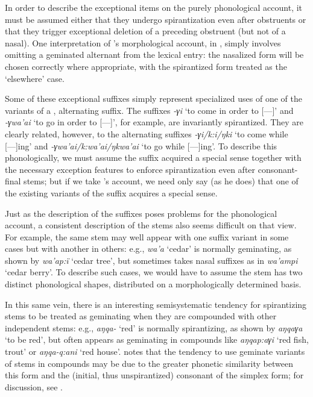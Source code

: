 In order to describe the exceptional items on the purely phonological
account, it must be assumed either that they undergo spirantization
even after obstruents or that they trigger exceptional deletion of a
preceding obstruent (but not of a nasal). One interpretation of
{\Sapir}'s morphological account, in , simply involves omitting a
geminated alternant from the lexical entry: the nasalized form will be
chosen correctly where appropriate, with the spirantized form treated
as the `elsewhere' case.

Some of these exceptional suffixes simply represent specialized uses
of one of the variants of a , alternating suffix. The suffixes
\emph{-γi} `to come in order to {[---]}' and \emph{-γwa'ai} `to go in
order to {[---]}', for example, are invariantly spirantized. They are
clearly related, however, to the alternating suffixes
\emph{-γi/k:i/ŋki} `to come while {[---]}ing' and
\emph{-γwa'ai/k:wa'ai/ŋkwa'ai} `to go while {[---]}ing'. To describe
this phonologically, we must assume the suffix acquired a special
sense together with the necessary exception features to enforce
spirantization even after consonant-final stems; but if we take
{\Sapir}'s account, we need only say (as he does) that one of the
existing variants of the  suffix acquires a special sense.

Just as the description of the suffixes poses problems for the
phonological account, a consistent description of the stems also seems
difficult on that view. For example, the same stem may well appear
with one suffix variant in some cases but with another in others:
e.g., \emph{wa'a} `cedar' is normally geminating, as shown by
\emph{wa'ap:ï} `cedar tree', but sometimes takes nasal suffixes as in
\emph{wa'ampi} `cedar berry'. To describe such cases, we would have to
assume the stem has two distinct phonological shapes, distributed on a
morphologically determined basis.

In this same vein, there is an interesting semisystematic tendency for
spirantizing stems to be treated as geminating when they are
compounded with other independent stems: e.g., \emph{aŋqa-} `red' is
normally spirantizing, as shown by \emph{aŋqaγa} `to be red', but
often appears as geminating in compounds like \emph{aŋqap:aγi} `red
fish, trout' or \emph{aŋqa-q:ani} `red house'. {\Sapir} notes that the
tendency to use geminate variants of stems in compounds may be due to
the greater phonetic similarity between this form and the (initial,
thus unspirantized) consonant of the simplex form; for discussion, see
\citealt{darden84:s.paiute}.

